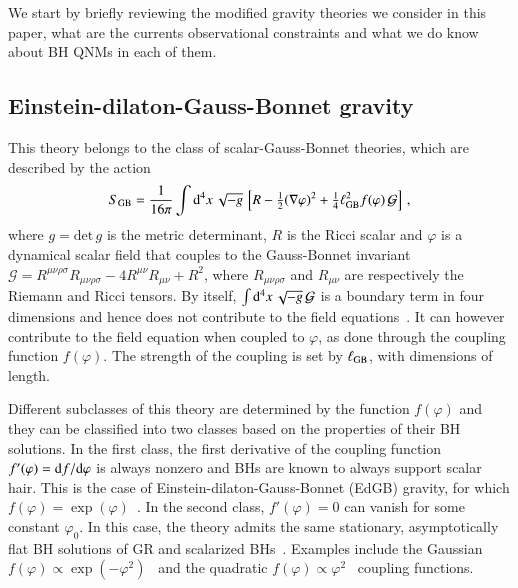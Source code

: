 \documentclass[twocolumn,
               prd,
               aps,
               superscriptaddress,
               tightenlines,
               nofootinbib,
               eqsecnum,
               amsfonts,
               amsmath,
               longbibliography]{revtex4-1}
\newcommand{\dd}{{\rm d}}
\newcommand{\dV}{{\rm d}^{4}x \, \sqrt{-g} \,}
\begin{document}
We start by briefly reviewing the modified gravity theories we consider in this
paper, what are the currents observational constraints and what we do know
about BH QNMs in each of them.

\subsection{Einstein-dilaton-Gauss-Bonnet gravity}
\label{sec:review_edgb}

This theory belongs to the class of scalar-Gauss-Bonnet theories, which are
described by the action
%
\begin{equation} \label{eq:action_sgb}
    S_{\rm GB} = \frac{1}{16 \pi}
    \int \dV
    \left[
    R - \tfrac{1}{2}(\nabla \varphi)^2
    + \tfrac{1}{4} \ell^{2}_{\rm GB} f(\varphi) \, \mathcal{G}
    \right]\,,
\end{equation}
%
where $g = \textrm{det} \, g$ is the metric determinant, $R$ is the Ricci
scalar and $\varphi$ is a dynamical scalar field that couples to the
Gauss-Bonnet invariant
%
$\mathcal{G} =
R^{\mu\nu\rho\sigma}R_{\mu\nu\rho\sigma}
- 4 R^{\mu\nu}R_{\mu\nu}
+ R^2$,
%
where $R_{\mu\nu\rho\sigma}$ and $R_{\mu\nu}$ are respectively the Riemann and Ricci tensors.
%
By itself, $\int \dV \mathcal{G}$ is a boundary term in four dimensions
and hence does not contribute to the field equations~\cite{Myers:1987yn}.
%
It can however contribute to the field equation when coupled to $\varphi$, as
done through the coupling function $f(\varphi)$. The strength of the coupling is
set by $\ell_{\rm GB}$, with dimensions of length.

Different subclasses of this theory are determined by the function $f(\varphi)$
and they can be classified into two classes based on the properties of their BH
solutions.
%
In the first class, the first derivative of the coupling function $f'(\varphi) = \dd f  / \dd \varphi$
is always nonzero and BHs are known to always support scalar hair.
%
This is the case of Einstein-dilaton-Gauss-Bonnet (EdGB) gravity, for which $f(\varphi) = \exp(\varphi)$~\cite{Kanti:1995vq}.
%
%
In the second class, $f'(\varphi) = 0$ can vanish for some constant $\varphi_0$.
%
In this case, the theory admits the same stationary, asymptotically flat BH
solutions of GR and scalarized BHs~\cite{Doneva:2017bvd,Silva:2017uqg,Macedo:2019sem,Dima:2020yac,Herdeiro:2020wei,Berti:2020kgk}.
%
Examples include the Gaussian $f(\varphi) \propto \exp(-\varphi^2)$~\cite{Doneva:2017bvd} and
the quadratic $f(\varphi) \propto \varphi^2$~\cite{Silva:2017uqg} coupling functions.
\end{document}
